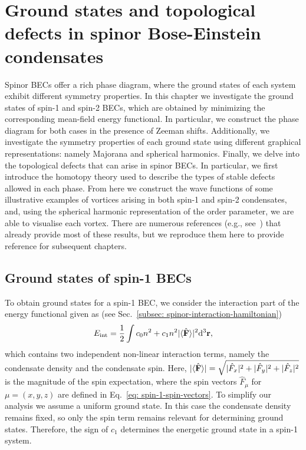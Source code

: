 \chapter[Ground states and topological defects in spinor Bose-Einstein
condensates][Ground states and topological defects]{\label{chap: ground-states}
Ground states and topological defects in spinor Bose-Einstein condensates}
Spinor BECs offer a rich phase diagram, where the ground states of each system
exhibit different symmetry properties.
In this chapter we investigate the ground states of spin-1 and spin-2 BECs,
which are obtained by minimizing the corresponding mean-field energy functional.
In particular, we construct the phase diagram for both cases in the presence
of Zeeman shifts.
Additionally, we investigate the symmetry properties of each ground state
using different graphical representations: namely Majorana and spherical
harmonics.
Finally, we delve into the topological defects that can arise in spinor
BECs.
In particular, we first introduce the homotopy theory used to describe the
types of stable defects allowed in each phase.
From here we construct the wave functions of some illustrative examples of
vortices arising in both spin-1 and spin-2 condensates, and,
using the spherical harmonic representation of the order parameter, we are able
to visualise each vortex.
There are numerous references (e.g., see~\cite{Ciobanu2000, Zhang2003,
Kawaguchi2012,Stamper-Kurn2013}) that already provide most of these results,
but we reproduce them here to provide reference for subsequent chapters.

\section{Ground states of spin-1 BECs}\label{sec: ground-states-spin-1}
To obtain ground states for a spin-1 BEC, we consider the interaction part of
the energy functional given as (see
Sec.~\ref{subsec: spinor-interaction-hamiltonian})
\begin{align}\label{eq: spin-1-int-energy}
    E_\mathrm{int} = \frac{1}{2}\int c_0n^2+c_1n^2|\langle \hat{\vb{F}} \rangle |^2 \dd^3\vb{r},
\end{align}
which contains two independent non-linear interaction terms, namely the
condensate density and the condensate spin.
Here, \(|\langle \hat{\vb{F}} \rangle | = \sqrt{|\hat{F}_x|^2 + |\hat{F}_y|^2 + |\hat{F}_z|^2}\) is the
magnitude of the spin expectation, where the spin vectors \(\hat{F}_\mu \) for
\(\mu = (x, y, z)\) are defined in Eq.~\eqref{eq: spin-1-spin-vectors}.
To simplify our analysis we assume a uniform ground state.
In this case the condensate density remains fixed, so only the spin term
remains relevant for determining ground states.
Therefore, the sign of \(c_1\) determines the energetic ground state in a
spin-1 system.

